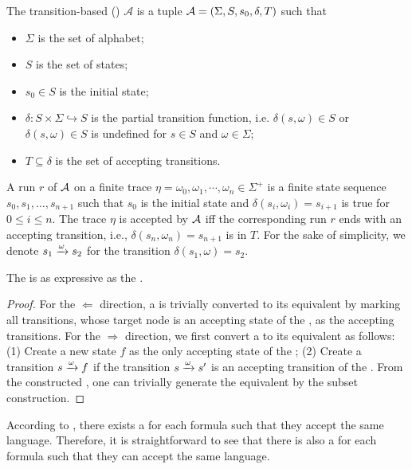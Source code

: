 \begin{definition}\label{def:tdfa}
The transition-based \dfa (\tdfa) $\mathcal{A}$ is a tuple $\mathcal{A} = (\Sigma,S,s_0,\delta,T)$ such that 
\begin{itemize}
    \item $\Sigma$ is the set of alphabet;
    \item $S$ is the set of states;
    \item $s_0\in S$ is the initial state;
    \item $\delta:S\times\Sigma\hookrightarrow S$ is the partial transition function, i.e. $\delta (s, \omega)\in S$ or $\delta (s, \omega)\in S$ is undefined for $s\in S$ and $\omega\in {\Sigma}$;
    \item $T \subseteq \delta$ is the set of accepting transitions.
\end{itemize}
\end{definition}

A run $r$ of $\mathcal{A}$ on a finite trace $\eta=\omega_0, \omega_1,\cdots, \omega_n \in \Sigma^+$ is a finite state sequence $s_0,s_1,\ldots,s_{n+1}$ such that $s_0$ is the initial state and $\delta (s_i, \omega_i) = s_{i+1}$ is true for $0\leq i \leq n$.
The trace $\eta$ is accepted by $\mathcal{A}$ iff the corresponding run $r$ ends with an accepting transition, i.e., $\delta (s_n, \omega_n) = s_{n+1}$ is in $T$. For the sake of simplicity, we denote $s_1\xrightarrow[]{\omega}s_2$ for the transition $\delta (s_1, \omega) = s_2$.

\begin{lemma}\label{lem:tdfa}
The \tdfa is as expressive as the \dfa.
\end{lemma}
\begin{proof}
	For the $\Leftarrow$ direction, a \dfa is trivially converted to its equivalent \tdfa by marking all transitions, whose target node is an accepting state of the \dfa, as the accepting transitions. For the $\Rightarrow$ direction, we first convert a \tdfa to its equivalent \nfa as follows: (1) Create a new state $f$ as the only accepting state of the \nfa; (2) Create a transition $s\xrightarrow[]{\omega}f$ if the transition $s\xrightarrow[]{\omega}s'$ is an accepting transition of the \tdfa. From the constructed \nfa, one can trivially generate the equivalent \dfa by the subset construction. 
\end{proof}


According to \cite{GV13}, there exists a \dfa for each \ltlf formula such that they accept the same language. Therefore, it is straightforward to see that there is also a \tdfa for each \ltlf formula such that they can accept the same language. 


